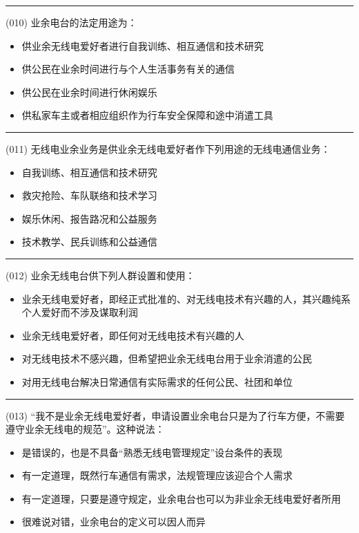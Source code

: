 \documentclass[twocolumn]{ctexart}  %
\begin{document}
\noindent\rule{0.5\textwidth}{1pt}
\heiti (010) 业余电台的法定用途为： \songti {\color{gray} [LK0008] }
\begin{itemize}
	\item  供业余无线电爱好者进行自我训练、相互通信和技术研究
	\item  供公民在业余时间进行与个人生活事务有关的通信
	\item  供公民在业余时间进行休闲娱乐
	\item  供私家车主或者相应组织作为行车安全保障和途中消遣工具
\end{itemize}


\noindent\rule{0.5\textwidth}{1pt}
\heiti (011) 无线电业余业务是供业余无线电爱好者作下列用途的无线电通信业务： \songti {\color{gray} [LK0111] }
\begin{itemize}
	\item  自我训练、相互通信和技术研究
	\item  救灾抢险、车队联络和技术学习
	\item  娱乐休闲、报告路况和公益服务
	\item  技术教学、民兵训练和公益通信
\end{itemize}


\noindent\rule{0.5\textwidth}{1pt}
\heiti (012) 业余无线电台供下列人群设置和使用： \songti {\color{gray} [LK0009] }
\begin{itemize}
	\item  业余无线电爱好者，即经正式批准的、对无线电技术有兴趣的人，其兴趣纯系个人爱好而不涉及谋取利润
	\item  业余无线电爱好者，即任何对无线电技术有兴趣的人
	\item  对无线电技术不感兴趣，但希望把业余无线电台用于业余消遣的公民
	\item  对用无线电台解决日常通信有实际需求的任何公民、社团和单位
\end{itemize}


\noindent\rule{0.5\textwidth}{1pt}
\heiti (013) “我不是业余无线电爱好者，申请设置业余电台只是为了行车方便，不需要遵守业余无线电的规范”。这种说法： \songti {\color{gray} [LK0051] }
\begin{itemize}
	\item  是错误的，也是不具备“熟悉无线电管理规定”设台条件的表现
	\item  有一定道理，既然行车通信有需求，法规管理应该迎合个人需求
	\item  有一定道理，只要是遵守规定，业余电台也可以为非业余无线电爱好者所用
	\item  很难说对错，业余电台的定义可以因人而异
\end{itemize}
\end{document}
